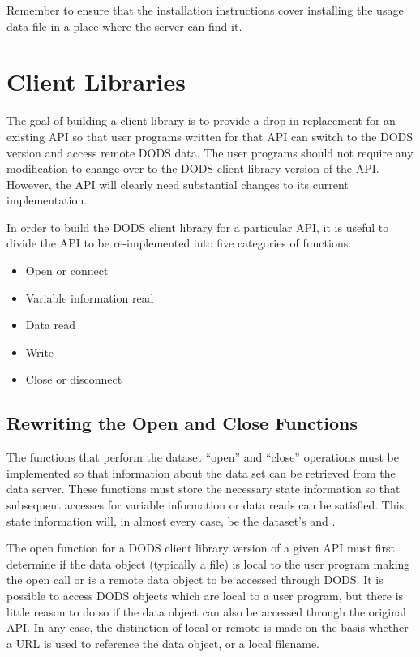 Remember to ensure that the installation instructions cover installing the
usage data file in a place where the server can find it.

\section{Client Libraries}

The goal of building a client library is to provide a drop-in
replacement for an existing API so that user programs written for that
API can switch to the DODS version and access remote DODS data. The
user programs should not require any modification to change over to
the DODS client library version of the API. However, the API will
clearly need substantial changes to its current implementation.

In order to build the DODS client library for a particular API, it is
useful to divide the API to be re-implemented into five categories of
functions:

\begin{itemize}
\item Open or connect
\item Variable information read
\item Data read
\item Write 
\item Close or disconnect
\end{itemize}

\subsection{Rewriting the Open and Close Functions}
\label{tk,client-lib-open}

The functions that perform the dataset ``open'' and ``close''
operations must be implemented so that information about the data set
can be retrieved from the data server. These functions must store the
necessary state information so that subsequent accesses for variable
information or data reads can be satisfied. This state information
will, in almost every case, be the dataset's  and
.

The open function for a DODS client library version of a given
API must first determine if the data object (typically a file) is
local to the user program making the open call or is a remote data
object to be accessed through DODS. It is possible to access DODS
objects which are local to a user program, but there is little reason
to do so if the data object can also be accessed through the original
API. In any case, the distinction of local or remote is made on the
basis whether a URL is used to reference the data object, or a local
filename.

